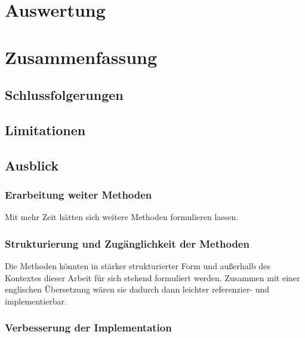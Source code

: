 \documentclass[oneside,bibliography=totocnumbered,BCOR=5mm]{scrbook}
\begin{document}
\chapter{Auswertung}

\chapter{Zusammenfassung}
\section{Schlussfolgerungen}
\section{Limitationen}
\section{Ausblick}

\subsection{Erarbeitung weiter Methoden}

Mit mehr Zeit hätten sich weitere Methoden formulieren lassen.

\subsection{Strukturierung und Zugänglichkeit der Methoden}

Die Methoden könnten in stärker strukturierter Form und außerhalb des Kontextes
dieser Arbeit für sich stehend formuliert werden. Zusammen mit einer englischen
Übersetzung wären sie dadurch dann leichter referenzier- und implementierbar.

\subsection{Verbesserung der Implementation}
\end{document}
